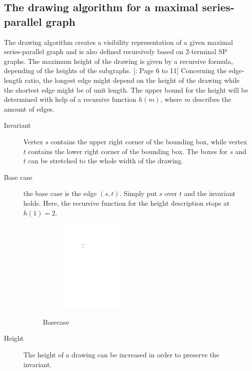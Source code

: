 \subsection{The drawing algorithm for a maximal series-parallel graph}
The drawing algorithm creates a visibility representation of a given maximal series-parallel graph and is also defined recursively based on 2-terminal SP graphs. The maximum height of the drawing is given by a recursive formula, depending of the heights of the subgraphs. [\cite{DBLP:journals/dcg/Biedl11}: Page 6 to 11]
Concerning the edge-length ratio, the longest edge might depend on the height of the drawing while the shortest edge might be of unit length. The upper bound for the height will be determined with help of a recursive function $h(m)$, where $m$ describes the amount of edges.
\begin{description}
	\item[Invariant] Vertex $s$ contains the upper right corner of the bounding box, while vertex $t$ contains the lower right corner of the bounding box. The boxes for $s$ and $t$ can be stretched to the whole width of the drawing.
	\item[Base case] the base case is the edge $(s,t)$. Simply put $s$ over $t$ and the invariant holds. Here, the recursive function for the height description stops at $h(1) = 2$.
		\begin{figure}[H]
		\centering
		\begin{subfigure}{0.3\linewidth}
			\centering
			\includegraphics[width=0.4\textwidth,page=1]{drawings/2-trees.pdf}
		\end{subfigure}
		\caption{Basecase }\label{im:SP_basecase}
	\end{figure}
	\item[Height] The height of a drawing can be increased in order to preserve the invariant. 

\end{description}
